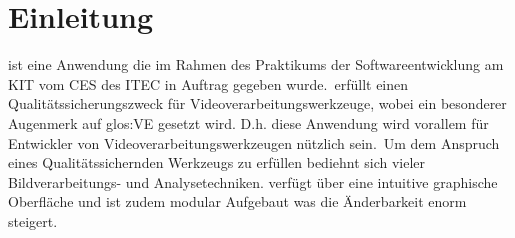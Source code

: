 \chapter{Einleitung}
\begin{normalsize}

\projektTitel ist eine Anwendung die im Rahmen des Praktikums der Softwareentwicklung am \gls{KIT} vom \gls{CES} des \gls{ITEC} in Auftrag gegeben wurde.\
\projektTitel erfüllt einen Qualitätssicherungszweck für Videoverarbeitungswerkzeuge, wobei ein besonderer Augenmerk auf \gls{glos:VE} gesetzt wird. D.h. diese Anwendung wird vorallem für Entwickler von Videoverarbeitungswerkzeugen nützlich sein.\
Um dem Anspruch eines Qualitätssichernden Werkzeugs zu erfüllen bediehnt \projektTitel sich vieler Bildverarbeitungs- und Analysetechniken. \projektTitel verfügt über eine intuitive graphische Oberfläche und ist zudem modular Aufgebaut was die Änderbarkeit enorm steigert.

\end{normalsize}


